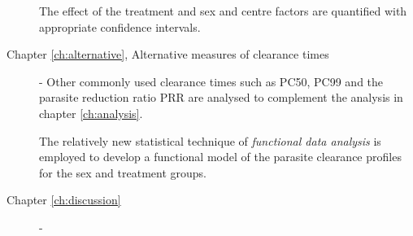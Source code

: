 \begin{description}
The effect of the treatment and sex and centre factors are quantified with appropriate confidence intervals.
\item[Chapter \ref{ch:alternative}, Alternative measures of clearance times] - Other commonly used clearance times such as PC50, PC99 and the parasite reduction ratio PRR are analysed to complement the analysis in chapter \ref{ch:analysis}.

The relatively new statistical technique of \emph{functional data analysis} is employed to develop a functional model of the parasite clearance profiles for the sex and treatment groups. 
 
\item[Chapter \ref{ch:discussion}] - 

\end{description}
